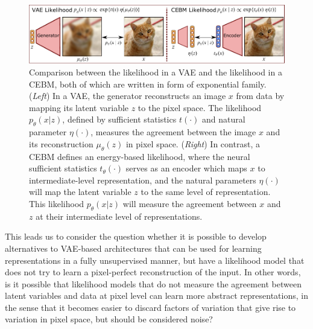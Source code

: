 \documentclass{article}
\begin{document}
\begin{figure}[!t]
\centering
\includegraphics[width=\textwidth]{figures/cebm_overview3.pdf}
\vspace*{-4ex}
\caption{Comparison between the likelihood in a VAE and the likelihood in a CEBM, both of which are written in form of exponential family. (\emph{Left}) In a VAE, the generator reconstructs an image $x$ from data by mapping its latent variable $z$ to the pixel space. The likelihood $p_\theta(x | z)$, defined by sufficient statistics $t(\cdot)$ and natural parameter $\eta(\cdot)$, measures the agreement between the image $x$ and its reconstruction $\mu_\theta(z)$ in pixel space. (\emph{Right}) In contrast, a CEBM defines an energy-based likelihood, where the neural sufficient statistics $t_\theta(\cdot)$ serves as an encoder which maps $x$ to intermediate-level representation, and the natural parameters $\eta(\cdot)$ will map the latent variable $z$ to the same level of representation. This likelihood $p_\theta(x | z)$ will measure the agreement between $x$ and $z$ at their intermediate level of representations.}
\label{fig:overview}
\end{figure}



This leads us to consider the question whether it is possible to develop alternatives to VAE-based architectures that can be used for learning representations in a fully unsupervised manner, but have a likelihood model that does not try to learn a pixel-perfect reconstruction of the input. In other words, is it possible that likelihood models that do not measure the agreement between latent variables and data at pixel level can learn more abstract representations, in the sense that it becomes easier to discard factors of variation that give rise to variation in pixel space, but should be considered noise?
\end{document}
